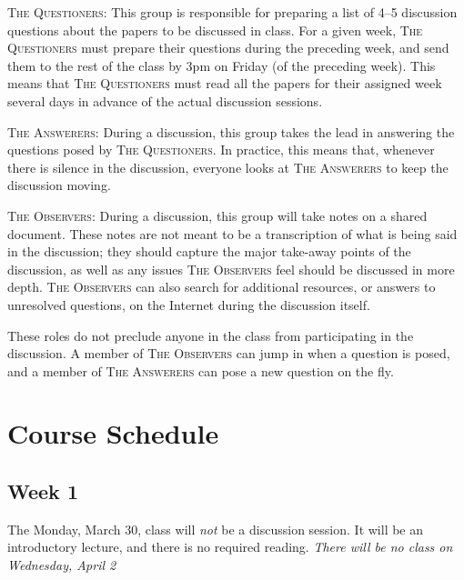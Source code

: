 \documentclass[11pt]{article}
\begin{document}
\begin{description}
 \item \textsc{The Questioners}: This group is responsible for preparing a list of 4--5 discussion questions about the papers to be discussed in class. For a given week, \textsc{The Questioners} must prepare their questions during the preceding week, and send them to the rest of the class by 3pm on Friday (of the preceding week). This means that \textsc{The Questioners} must read all the papers for their assigned week several days in advance of the actual discussion sessions.
 
 \item \textsc{The Answerers}: During a discussion, this group takes the lead in answering the questions posed by \textsc{The Questioners}. In practice, this means that, whenever there is silence in the discussion, everyone looks at \textsc{The Answerers} to keep the discussion moving.
 
 \item \textsc{The Observers}: During a discussion, this group will take notes on a shared document. These notes are not meant to be a transcription of what is being said in the discussion; they should capture the major take-away points of the discussion, as well as any issues \textsc{The Observers} feel should be discussed in more depth. \textsc{The Observers} can also search for additional resources, or answers to unresolved questions, on the Internet during the discussion itself.
\end{description}

These roles do not preclude anyone in the class from participating in the discussion. A member of \textsc{The Observers} can jump in when a question is posed, and a member of \textsc{The Answerers} can pose a new question on the fly. 


\section{Course Schedule}
\label{sec:schedule}



\subsection{Week 1}

The Monday, March 30, class will \emph{not} be a discussion session. It will be an introductory lecture, and there is no required reading. \emph{There will be no class on Wednesday, April 2}
\end{document}
